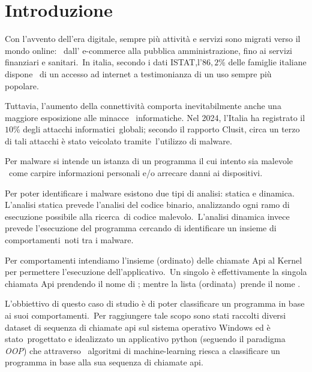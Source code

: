 \newcommand{\percc}[1]{$#1$\%}

\chapter{Introduzione}



Con l'avvento dell'era digitale, sempre più attività e servizi sono migrati verso il mondo online: \
dall' e-commerce alla pubblica amministrazione, fino ai servizi finanziari e sanitari.\
In italia, secondo i dati ISTAT,l'\percc{86,2} delle famiglie italiane dispone \
di un accesso ad internet a testimonianza di un uso sempre più popolare\cite{istat.internet-usage}.

Tuttavia, l'aumento della connettività comporta inevitabilmente anche una maggiore esposizione alle minacce \
informatiche. Nel 2024, l'Italia ha registrato il \percc{10} degli attacchi informatici\
globali; secondo il rapporto Clusit, circa un terzo di tali attacchi è stato veicolato tramite\
l'utilizzo di malware\cite{clusit.italy-malware}.

Per malware si intende un istanza di un programma il cui intento sia malevole \
come carpire informazioni personali e/o arrecare danni ai dispositivi\cite{idika2007survey}.

Per poter identificare i malware esistono due tipi di analisi: statica e dinamica.
L'analisi statica prevede l'analisi del codice binario, analizzando ogni ramo di esecuzione possibile alla ricerca\
di codice malevolo.\
L'analisi dinamica invece prevede l'esecuzione del programma cercando di identificare un insieme di comportamenti\
noti tra i malware\cite{doi:10.1155/2015/659101}.\

Per comportamenti intendiamo l'insieme (ordinato) delle chiamate Api al Kernel per permettere l'esecuzione dell'applicativo.\
Un singolo  è effettivamente la singola chiamata Api prendendo il nome di ; mentre la lista (ordinata)\
prende il nome \cite{6680850}.

L'obbiettivo di questo caso di studio è di poter classificare un programma in base ai suoi comportamenti.\
Per raggiungere tale scopo sono stati raccolti diversi dataset di sequenza di chiamate api sul sistema operativo Windows ed è stato\
progettato e idealizzato un applicativo python (seguendo il paradigma \textit{OOP}) che attraverso \
algoritmi di machine-learning riesca a classificare un programma in base alla sua sequenza di chiamate api.


